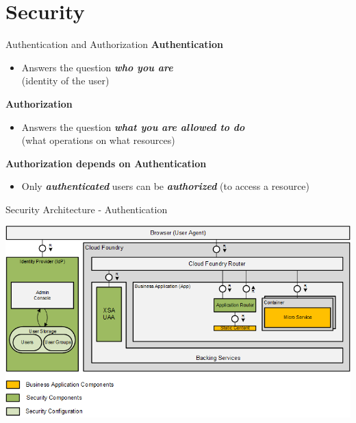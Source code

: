 \part{Security}

\begin{frame}{Authentication and Authorization}
\textbf{Authentication}
	\begin{itemize}
		\item Answers the question \emph{\textbf{who you are}} \\(identity of the user)\\\vspace{9mm}
	\end{itemize}
\textbf{Authorization}
	\begin{itemize}
		\item Answers the question \emph{\textbf{what you are allowed to do}} \\(what operations on what resources)\\\vspace{9mm}
	\end{itemize}
\textbf{Authorization depends on Authentication}
	\begin{itemize}
		\item Only \emph{\textbf{authenticated}} users can be \emph{\textbf{authorized}} (to access a resource)\\\vspace{9mm}
	\end{itemize}
\end{frame}


\begin{frame}{Security Architecture - Authentication}
\centerline{\includegraphics[width=1\textwidth]{../Security/images/XSA-Overview-Authentication}}
\end{frame}

